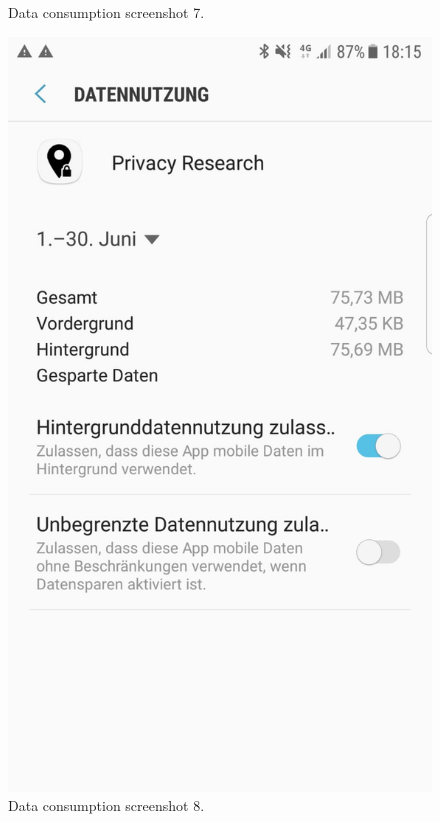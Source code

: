 \begin{figure}
\begin{minipage}{.45\textwidth}
\begin{center}
		\caption{Data consumption screenshot 7.}
		\end{center}
	\end{minipage}
	\hfill
	\begin{minipage}{.45\textwidth}
		\begin{center}
		\includegraphics[width=\textwidth]{data/data-usage/data-usage7.jpeg}
		\caption{Data consumption screenshot 8.}
		\end{center}
	\end{minipage}
\end{figure}

